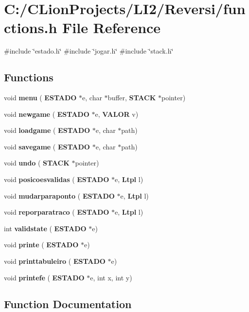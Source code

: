 \section{C\+:/\+C\+Lion\+Projects/\+L\+I2/\+Reversi/functions.h File Reference}
\label{functions_8h}
{\ttfamily \#include \char`\"{}estado.\+h\char`\"{}}\newline
{\ttfamily \#include \char`\"{}jogar.\+h\char`\"{}}\newline
{\ttfamily \#include \char`\"{}stack.\+h\char`\"{}}\newline
\subsection*{Functions}
\begin{DoxyCompactItemize}
\item 
void \textbf{ menu} (\textbf{ E\+S\+T\+A\+DO} $\ast$e, char $\ast$buffer, \textbf{ S\+T\+A\+CK} $\ast$pointer)
\item 
void \textbf{ newgame} (\textbf{ E\+S\+T\+A\+DO} $\ast$e, \textbf{ V\+A\+L\+OR} v)
\item 
void \textbf{ loadgame} (\textbf{ E\+S\+T\+A\+DO} $\ast$e, char $\ast$path)
\item 
void \textbf{ savegame} (\textbf{ E\+S\+T\+A\+DO} $\ast$e, char $\ast$path)
\item 
void \textbf{ undo} (\textbf{ S\+T\+A\+CK} $\ast$pointer)
\item 
void \textbf{ posicoesvalidas} (\textbf{ E\+S\+T\+A\+DO} $\ast$e, \textbf{ Ltpl} l)
\item 
void \textbf{ mudarparaponto} (\textbf{ E\+S\+T\+A\+DO} $\ast$e, \textbf{ Ltpl} l)
\item 
void \textbf{ reporparatraco} (\textbf{ E\+S\+T\+A\+DO} $\ast$e, \textbf{ Ltpl} l)
\item 
int \textbf{ validstate} (\textbf{ E\+S\+T\+A\+DO} $\ast$e)
\item 
void \textbf{ printe} (\textbf{ E\+S\+T\+A\+DO} $\ast$e)
\item 
void \textbf{ printtabuleiro} (\textbf{ E\+S\+T\+A\+DO} $\ast$e)
\item 
void \textbf{ printefe} (\textbf{ E\+S\+T\+A\+DO} $\ast$e, int x, int y)
\end{DoxyCompactItemize}


\subsection{Function Documentation}
\mbox{\label{functions_8h_a0daf61186845aff72b41fbcabce18b17}} 

